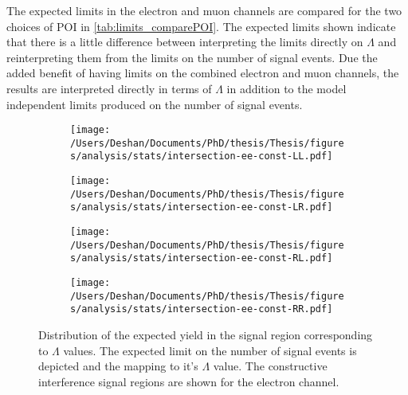 The expected limits in the electron and muon channels are compared for the two choices of POI in \cref{tab:limits_comparePOI}. The expected limits shown indicate that there is a little difference between interpreting the limits directly on $\Lambda$ and reinterpreting them from the limits on the number of signal events. Due the added benefit of having limits on the combined electron and muon channels, the results are interpreted directly in terms of $\Lambda$ in addition to the model independent limits produced on the number of signal events. 

\begin{figure}[h!]
    \centering
    \begin{subfigure}[b]{0.49\textwidth}
        \centering
        \texttt{[image: /Users/Deshan/Documents/PhD/thesis/Thesis/figures/analysis/stats/intersection-ee-const-LL.pdf]}
        \label{fig:bkgmodel:interpee1}
    \end{subfigure}
    \begin{subfigure}[b]{0.49\textwidth}
        \centering
        \texttt{[image: /Users/Deshan/Documents/PhD/thesis/Thesis/figures/analysis/stats/intersection-ee-const-LR.pdf]}
        \label{fig:bkgmodel:interpee2}
    \end{subfigure}
    \begin{subfigure}[b]{0.49\textwidth}
        \centering
        \texttt{[image: /Users/Deshan/Documents/PhD/thesis/Thesis/figures/analysis/stats/intersection-ee-const-RL.pdf]}
        \label{fig:bkgmodel:interpee3}
    \end{subfigure}
    \begin{subfigure}[b]{0.49\textwidth}
        \centering
        \texttt{[image: /Users/Deshan/Documents/PhD/thesis/Thesis/figures/analysis/stats/intersection-ee-const-RR.pdf]}
        \label{fig:bkgmodel:interpee4}
    \end{subfigure}
    \caption{Distribution of the expected yield in the signal region corresponding to $\Lambda$ values. The expected limit on the number of signal events is depicted and the mapping to it's $\Lambda$ value. The constructive interference signal regions are shown for the electron channel.}
    \label{fig:stats:interpeeconst}
\end{figure}

